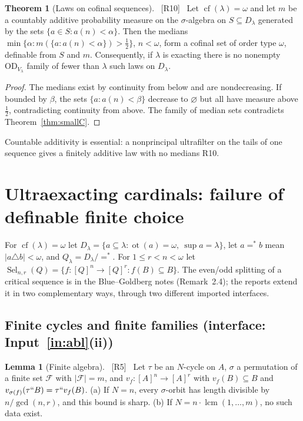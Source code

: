 \documentclass[11pt,letterpaper]{article}
\theoremstyle{definition}
\newtheorem{theorem}[definition]{Theorem}
\newtheorem{lemma}[definition]{Lemma}
\numberwithin{equation}{section}
\newcommand{\OD}{\mathrm{OD}}
\newcommand{\cf}{\operatorname{cf}}
\newcommand{\ot}{\operatorname{ot}}
\newcommand{\lcm}{\operatorname{lcm}}
\newcommand{\Sel}{\operatorname{Sel}}
\newcommand{\FF}{\mathcal F}
\newcommand{\src}[1]{\unskip\ {\normalfont\small\sffamily\color{Olive}[#1]}\ }
\newcommand{\R}[1]{\textsf{R#1}}
\begin{document}
\begin{theorem}[Laws on cofinal sequences]\label{thm:laws}\src{R10}
Let $\cf(\lambda)=\omega$ and let $m$ be a countably additive probability measure on the $\sigma$-algebra on $S\subseteq D_\lambda$ generated by the sets $\{a\in S:a(n)<\alpha\}$. Then the medians $\min\{\alpha:m(\{a:a(n)<\alpha\})>\tfrac12\}$, $n<\omega$, form a cofinal set of order type $\omega$, definable from $S$ and $m$. Consequently, if $\lambda$ is exacting there is no nonempty $\OD_{V_\lambda}$ family of fewer than $\lambda$ such laws on $D_\lambda$.
\end{theorem}

\begin{proof}
The medians exist by continuity from below and are nondecreasing. If bounded by $\beta$, the sets $\{a:a(n)<\beta\}$ decrease to $\varnothing$ but all have measure above $\tfrac12$, contradicting continuity from above. The family of median sets contradicts Theorem~\ref{thm:smallC}.
\end{proof}

Countable additivity is essential: a nonprincipal ultrafilter on the tails of one sequence gives a finitely additive law with no medians \R{10}.

\section{Ultraexacting cardinals: failure of definable finite choice}\label{sec:uex}

For $\cf(\lambda)=\omega$ let $D_\lambda=\{a\subseteq\lambda:\ot(a)=\omega,\ \sup a=\lambda\}$, let $a=^*b$ mean $|a\triangle b|<\omega$, and $Q_\lambda=D_\lambda/{=^*}$. For $1\le r<n<\omega$ let $\Sel_{n,r}(Q)=\{f:[Q]^n\to[Q]^r:f(B)\subseteq B\}$. The even/odd splitting of a critical sequence is in the Blue--Goldberg notes (Remark~2.4); the reports extend it in two complementary ways, through two different imported interfaces.

\subsection{Finite cycles and finite families (interface: Input~\ref{in:abl}(ii))}

\begin{lemma}[Finite algebra]\label{lem:algebra}\src{R5}
Let $\tau$ be an $N$-cycle on $A$, $\sigma$ a permutation of a finite set $\FF$ with $|\FF|=m$, and $v_f:[A]^n\to[A]^r$ with $v_f(B)\subseteq B$ and $v_{\sigma(f)}(\tau``B)=\tau``v_f(B)$. (a) If $N=n$, every $\sigma$-orbit has length divisible by $n/\gcd(n,r)$, and this bound is sharp. (b) If $N=n\cdot\lcm(1,\dots,m)$, no such data exist.
\end{lemma}
\end{document}
